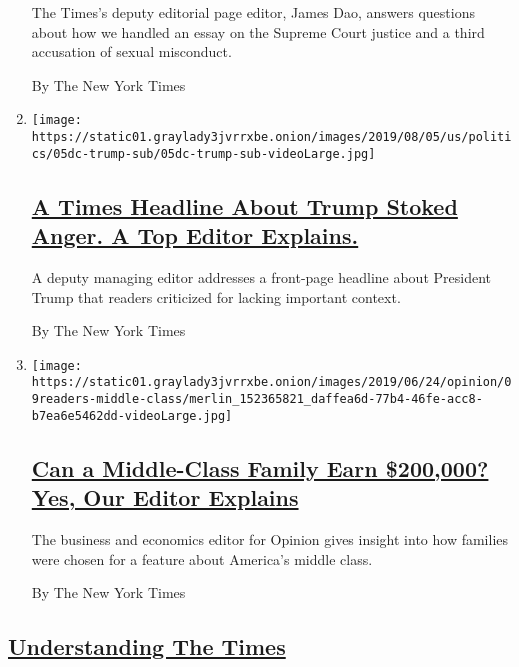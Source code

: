 \begin{enumerate}
  The Times's deputy editorial page editor, James Dao, answers questions
  about how we handled an essay on the Supreme Court justice and a third
  accusation of sexual misconduct.

  By The New York Times
\item
  \texttt{[image: https://static01.graylady3jvrrxbe.onion/images/2019/08/05/us/politics/05dc-trump-sub/05dc-trump-sub-videoLarge.jpg]}

  \hypertarget{a-times-headline-about-trump-stoked-anger-a-top-editor-explains}{%
  \subsection{\texorpdfstring{\href{/2019/08/06/reader-center/trump-mass-shootings-headline.html}{A
  Times Headline About Trump Stoked Anger. A Top Editor
  Explains.}}{A Times Headline About Trump Stoked Anger. A Top Editor Explains.}}\label{a-times-headline-about-trump-stoked-anger-a-top-editor-explains}}

  A deputy managing editor addresses a front-page headline about
  President Trump that readers criticized for lacking important context.

  By The New York Times
\item
  \texttt{[image: https://static01.graylady3jvrrxbe.onion/images/2019/06/24/opinion/09readers-middle-class/merlin\_152365821\_daffea6d-77b4-46fe-acc8-b7ea6e5462dd-videoLarge.jpg]}

  \hypertarget{can-a-middle-class-family-earn-200000-yes-our-editor-explains}{%
  \subsection{\texorpdfstring{\href{/2019/07/09/reader-center/middle-class-families.html}{Can
  a Middle-Class Family Earn \$200,000? Yes, Our Editor
  Explains}}{Can a Middle-Class Family Earn \$200,000? Yes, Our Editor Explains}}\label{can-a-middle-class-family-earn-200000-yes-our-editor-explains}}

  The business and economics editor for Opinion gives insight into how
  families were chosen for a feature about America's middle class.

  By The New York Times
\end{enumerate}

\hypertarget{understanding-the-times}{%
\subsection{\texorpdfstring{\href{/series/understanding-the-times}{Understanding
The Times}}{Understanding The Times}}\label{understanding-the-times}}

